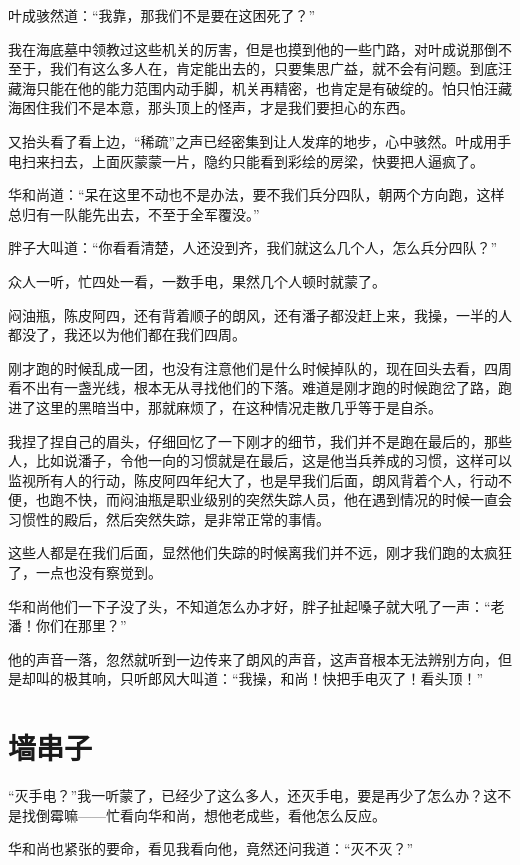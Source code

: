 叶成骇然道：“我靠，那我们不是要在这困死了？”

我在海底墓中领教过这些机关的厉害，但是也摸到他的一些门路，对叶成说那倒不至于，我们有这么多人在，肯定能出去的，只要集思广益，就不会有问题。到底汪藏海只能在他的能力范围内动手脚，机关再精密，也肯定是有破绽的。怕只怕汪藏海困住我们不是本意，那头顶上的怪声，才是我们要担心的东西。

又抬头看了看上边，“稀疏”之声已经密集到让人发痒的地步，心中骇然。叶成用手电扫来扫去，上面灰蒙蒙一片，隐约只能看到彩绘的房梁，快要把人逼疯了。

华和尚道：“呆在这里不动也不是办法，要不我们兵分四队，朝两个方向跑，这样总归有一队能先出去，不至于全军覆没。”

胖子大叫道：“你看看清楚，人还没到齐，我们就这么几个人，怎么兵分四队？”

众人一听，忙四处一看，一数手电，果然几个人顿时就蒙了。

闷油瓶，陈皮阿四，还有背着顺子的朗风，还有潘子都没赶上来，我操，一半的人都没了，我还以为他们都在我们四周。

刚才跑的时候乱成一团，也没有注意他们是什么时候掉队的，现在回头去看，四周看不出有一盏光线，根本无从寻找他们的下落。难道是刚才跑的时候跑岔了路，跑进了这里的黑暗当中，那就麻烦了，在这种情况走散几乎等于是自杀。

我捏了捏自己的眉头，仔细回忆了一下刚才的细节，我们并不是跑在最后的，那些人，比如说潘子，令他一向的习惯就是在最后，这是他当兵养成的习惯，这样可以监视所有人的行动，陈皮阿四年纪大了，也是早我们后面，朗风背着个人，行动不便，也跑不快，而闷油瓶是职业级别的突然失踪人员，他在遇到情况的时候一直会习惯性的殿后，然后突然失踪，是非常正常的事情。

这些人都是在我们后面，显然他们失踪的时候离我们并不远，刚才我们跑的太疯狂了，一点也没有察觉到。

华和尚他们一下子没了头，不知道怎么办才好，胖子扯起嗓子就大吼了一声：“老潘！你们在那里？”

他的声音一落，忽然就听到一边传来了朗风的声音，这声音根本无法辨别方向，但是却叫的极其响，只听郎风大叫道：“我操，和尚！快把手电灭了！看头顶！”

\chapter{墙串子}

“灭手电？”我一听蒙了，已经少了这么多人，还灭手电，要是再少了怎么办？这不是找倒霉嘛——忙看向华和尚，想他老成些，看他怎么反应。

华和尚也紧张的要命，看见我看向他，竟然还问我道：“灭不灭？”

